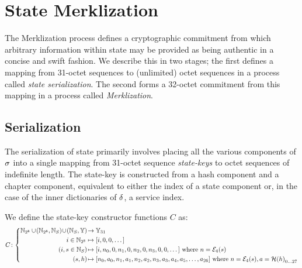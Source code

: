 \section{State Merklization}\label{sec:statemerklization}

The Merklization process defines a cryptographic commitment from which arbitrary information within state may be provided as being authentic in a concise and swift fashion. We describe this in two stages; the first defines a mapping from 31-octet sequences to (unlimited) octet sequences in a process called \emph{state serialization}. The second forms a 32-octet commitment from this mapping in a process called \emph{Merklization}.

\subsection{Serialization}

The serialization of state primarily involves placing all the various components of $\sigma$ into a single mapping from 31-octet sequence \emph{state-keys} to octet sequences of indefinite length. The state-key is constructed from a hash component and a chapter component, equivalent to either the index of a state component or, in the case of the inner dictionaries of $\delta$, a service index.

We define the state-key constructor functions $C$ as:
\begin{equation}
  C\colon\abracegroup{
    \Nbits{8} \cup \tup{\Nbits{8}, \serviceid} \cup \tup{\serviceid, \blob} &\to \bloboflen{31} \\
    i \in \Nbits{8} &\mapsto [i, 0, 0, \dots] \\
    \tup{i, s \in \serviceid} &\mapsto \sq{i, n_0, 0, n_1, 0, n_2, 0, n_3, 0, 0, \dots}\ \where n = \fixedencode{4}{s} \\
    \tup{s, h} &\mapsto \sq{n_0, a_0, n_1, a_1, n_2, a_2, n_3, a_3, a_4, a_5, \dots, a_{26}}\ \where n = \fixedencode{4}{s}, a = \blake{h}\interval{0}{27}
  }
\end{equation}

